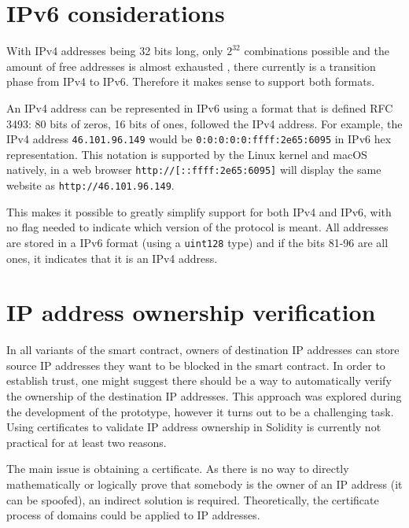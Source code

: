 \section{IPv6 considerations}

With IPv4 addresses being 32 bits long, only $ 2^{32} $ combinations possible and the amount of free addresses is almost exhausted \cite{IPv4Exhaustion}, there currently is a transition phase from IPv4 to IPv6. Therefore it makes sense to support both formats.

An IPv4 address can be represented in IPv6 using a format that is defined RFC 3493: 80 bits of zeros, 16 bits of ones, followed the IPv4 address. For example, the IPv4 address \texttt{46.101.96.149} would be \texttt{0:0:0:0:0:ffff:2e65:6095} in IPv6 hex representation. This notation is supported by the Linux kernel and macOS natively, in a web browser \texttt{http://[::ffff:2e65:6095]} will display the same website as \texttt{http://46.101.96.149}.

This makes it possible to greatly simplify support for both IPv4 and IPv6, with no flag needed to indicate which version of the protocol is meant. All addresses are stored in a IPv6 format (using a \texttt{uint128} type) and if the bits 81-96 are all ones, it indicates that it is an IPv4 address.







\section{IP address ownership verification}

In all variants of the smart contract, owners of destination IP addresses can store source IP addresses they want to be blocked in the smart contract. In order to establish trust, one might suggest there should be a way to automatically verify the ownership of the destination IP addresses. This approach was explored during the development of the prototype, however it turns out to be a challenging task. Using certificates to validate IP address ownership in Solidity is currently not practical for at least two reasons.

The main issue is obtaining a certificate. As there is no way to directly mathematically or logically prove that somebody is the owner of an IP address (it can be spoofed), an indirect solution is required. Theoretically, the certificate process of domains could be applied to IP addresses.

